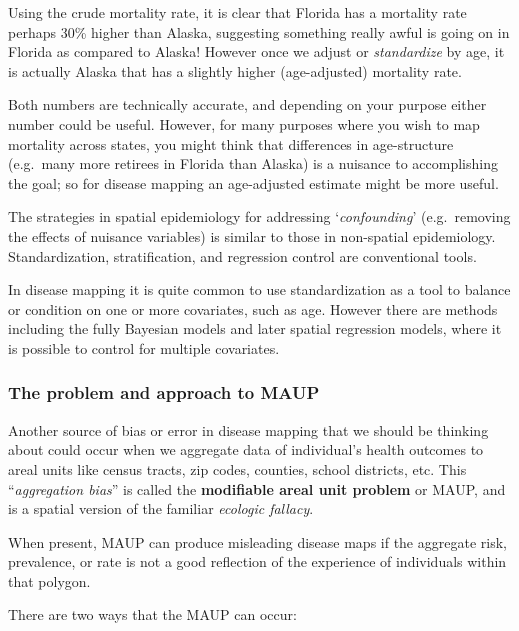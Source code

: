 \documentclass[
]{book}
\begin{document}
Using the crude mortality rate, it is clear that Florida has a mortality rate perhaps 30\% higher than Alaska, suggesting something really awful is going on in Florida as compared to Alaska! However once we adjust or \emph{standardize} by age, it is actually Alaska that has a slightly higher (age-adjusted) mortality rate.

Both numbers are technically accurate, and depending on your purpose either number could be useful. However, for many purposes where you wish to map mortality across states, you might think that differences in age-structure (e.g.~many more retirees in Florida than Alaska) is a nuisance to accomplishing the goal; so for disease mapping an age-adjusted estimate might be more useful.

The strategies in spatial epidemiology for addressing `\emph{confounding}' (e.g.~removing the effects of nuisance variables) is similar to those in non-spatial epidemiology. Standardization, stratification, and regression control are conventional tools.

In disease mapping it is quite common to use standardization as a tool to balance or condition on one or more covariates, such as age. However there are methods including the fully Bayesian models and later spatial regression models, where it is possible to control for multiple covariates.

\hypertarget{the-problem-and-approach-to-maup}{%
\subsubsection{The problem and approach to MAUP}\label{the-problem-and-approach-to-maup}}

Another source of bias or error in disease mapping that we should be thinking about could occur when we aggregate data of individual's health outcomes to areal units like census tracts, zip codes, counties, school districts, etc. This ``\emph{aggregation bias}'' is called the \textbf{modifiable areal unit problem} or MAUP, and is a spatial version of the familiar \emph{ecologic fallacy}.

When present, MAUP can produce misleading disease maps if the aggregate risk, prevalence, or rate is not a good reflection of the experience of individuals within that polygon.

There are two ways that the MAUP can occur:
\end{document}
